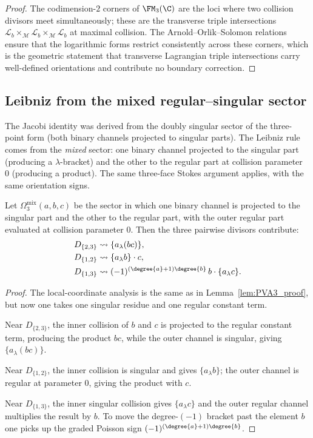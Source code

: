 \begin{proof}
The codimension-$2$ corners of $\FM_3(\C)$ are the loci where two
collision divisors meet simultaneously; these are the transverse triple
intersections $\mathscr{L}_b \times_{\mathscr{M}} \mathscr{L}_b
\times_{\mathscr{M}} \mathscr{L}_b$ at maximal collision. The
Arnold--Orlik--Solomon relations ensure that the logarithmic forms
restrict consistently across these corners, which is the geometric
statement that transverse Lagrangian triple intersections carry
well-defined orientations and contribute no boundary correction.
\end{proof}

\subsection{Leibniz from the mixed regular--singular sector}

The Jacobi identity was derived from the doubly singular sector of
the three-point form (both binary channels projected to singular
parts). The Leibniz rule comes from the \emph{mixed} sector: one
binary channel projected to the singular part (producing a
$\lambda$-bracket) and the other to the regular part at collision
parameter~$0$ (producing a product). The same three-face Stokes
argument applies, with the same orientation signs.

\begin{lemma}
\label{lem:three-face-leibniz}
Let $\Omega_3^{\mathrm{mix}}(a,b,c)$ be the sector in which one binary channel is
projected to the singular part and the other to the regular part, with the outer regular
part evaluated at collision parameter $0$. Then the three pairwise divisors contribute:
\begin{align}
\label{eq:res23-leibniz}
D_{\{2,3\}} &\leadsto \{a_\lambda (bc)\},\\
\label{eq:res12-leibniz}
D_{\{1,2\}} &\leadsto \{a_\lambda b\}\cdot c,\\
\label{eq:res13-leibniz}
D_{\{1,3\}} &\leadsto
(-1)^{(\degree{a}+1)\degree{b}}\,
b\cdot\{a_\lambda c\}.
\end{align}
\end{lemma}

\begin{proof}
The local-coordinate analysis is the same as in Lemma~\ref{lem:PVA3_proof}, but now
one takes one singular residue and one regular constant term.

Near $D_{\{2,3\}}$, the inner collision of $b$ and $c$ is projected to the regular
constant term, producing the product $bc$, while the outer channel is singular, giving
$\{a_\lambda(bc)\}$.

Near $D_{\{1,2\}}$, the inner collision is singular and gives $\{a_\lambda b\}$; the
outer channel is regular at parameter $0$, giving the product with $c$.

Near $D_{\{1,3\}}$, the inner singular collision gives $\{a_\lambda c\}$ and the
outer regular channel multiplies the result by $b$. To move the degree-$(-1)$ bracket
past the element $b$ one picks up the graded Poisson sign
$(-1)^{(\degree{a}+1)\degree{b}}$.
\end{proof}

